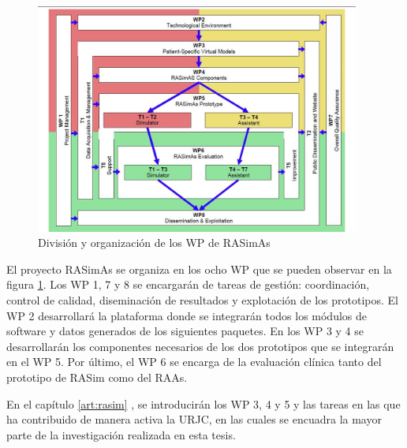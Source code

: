 
\begin{figure}
    \centering
    \includegraphics[width=0.95\textwidth]{IMG/wp_overview.jpg}
    \caption{División y organización de los \acl{WP} de \ac{RASimAs}}
    \label{fig:wp_rasimas}
\end{figure}

El proyecto \ac{RASimAs} se organiza en los ocho \ac{WP} que se pueden observar en la figura \ref{fig:wp_rasimas}. Los \ac{WP} 1, 7 y 8 se encargarán de tareas de gestión: coordinación, control de calidad, diseminación de resultados y explotación de los prototipos. El \ac{WP} 2 desarrollará la plataforma donde se integrarán todos los módulos de software y datos generados de los siguientes paquetes. En los \ac{WP} 3 y 4 se desarrollarán los componentes necesarios de los dos prototipos que se integrarán en el \ac{WP} 5. Por último, el \ac{WP} 6 se encarga de la evaluación clínica tanto del prototipo de \ac{RASim} como del \ac{RAAs}. 

En el capítulo \ref{art:rasim} , se introducirán los \ac{WP} 3, 4 y 5 y las tareas en las que ha contribuido de manera activa la \ac{URJC}, en las cuales se encuadra la mayor parte de la investigación realizada en esta tesis.


